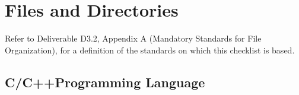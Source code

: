 \documentclass{CSSRforAfrica}
\begin{document}
\newpage
 
 
\pagebreak
\tableofcontents
\newpage
 

\section{Files and Directories}

Refer to Deliverable D3.2, Appendix A (Mandatory Standards for  File Organization), for a definition of the standards on which this checklist is based.

 \subsection{C/C++Programming Language}
\end{document}
